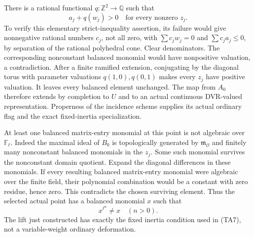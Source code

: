There is a rational functional \(q:\mathbb Z^2\to\mathbb Q\)
such that
\[
                            a_j+q(w_j)>0
                       \quad\text{for every nonzero }z_j. \tag{FE2}
\]
To verify this elementary strict-inequality assertion, its
failure would give nonnegative rational numbers \(c_j\),
not all zero, with
\(\sum c_jw_j=0\) and \(\sum c_ja_j\le0\), by separation
of the rational polyhedral cone.
Clear denominators. The corresponding nonconstant balanced
monomial would have nonpositive valuation, a contradiction.
After a finite ramified extension, conjugating by the
diagonal torus with parameter valuations \(q(1,0),q(0,1)\)
makes every \(z_j\) have positive valuation.
It leaves every balanced element unchanged.
The map from \(A_0\) therefore extends by completion to
\(U\) and to an actual continuous DVR-valued representation.
Properness of the incidence scheme supplies its actual
ordinary flag and the exact fixed-inertia specialization.

At least one balanced matrix-entry monomial at this point
is not algebraic over \(\mathbb F_\ell\).
Indeed the maximal ideal of \(B_0\) is topologically generated
by \(\mathfrak m_{\mathcal O}\) and finitely many
nonconstant balanced monomials in the \(z_j\).
Some such monomial survives the nonconstant domain quotient.
Expand the diagonal differences in these monomials.
If every resulting balanced matrix-entry monomial were
algebraic over the finite field, their polynomial combination
would be a constant with zero residue, hence zero.
This contradicts the chosen surviving element.
Thus the selected actual point has a balanced monomial \(x\)
such that
\[
                          x^{\ell^n}\ne x
                                      \quad(n>0).        \tag{FE3}
\]
The lift just constructed has exactly the fixed inertia
condition used in (TA7), not a variable-weight ordinary
deformation.

